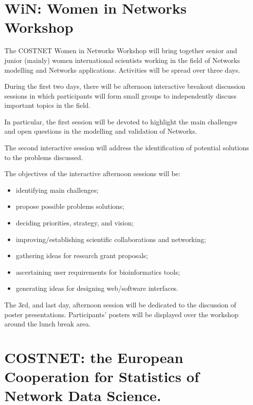 %
\section{WiN: Women in Networks Workshop}
The COSTNET Women in Networks Workshop will bring together senior and junior (mainly) women international scientists working in the field of Networks modelling and Networks applications. Activities will be spread over three days.

During the first two days, there will be afternoon interactive breakout discussion sessions in which participants will form small groups to independently discuss important topics in the field.

In particular, the first session will be devoted to highlight the main challenges and open questions in the modelling and validation of Networks.

The second interactive session will address the identification of potential solutions to the problems discussed.

The objectives of the interactive afternoon sessions will be:
\begin{itemize}
\item identifying main challenges;
\item propose possible problems solutions;
\item deciding priorities, strategy, and vision;
\item improving/establishing scientific collaborations and networking;
\item gathering ideas for research grant proposals;
\item ascertaining user requirements for bioinformatics tools;
\item generating ideas for designing web/software interfaces.
\end{itemize}
The 3rd, and last day, afternoon session will be dedicated to the discussion of poster presentations. Participants' posters will be displayed over the workshop around the lunch break area.

\section{COSTNET: the European Cooperation for Statistics of Network Data Science.}


